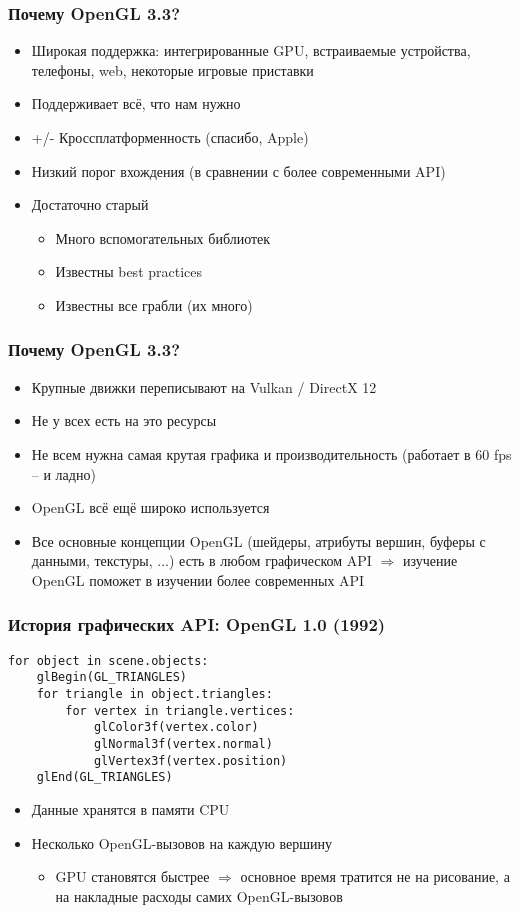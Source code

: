 \documentclass{beamer}
\begin{document}
\begin{frame}
\frametitle{Почему OpenGL 3.3?}
\pause
\begin{itemize}
\item Широкая поддержка: интегрированные GPU, встраиваемые устройства, телефоны, web, некоторые игровые приставки
\pause
\item Поддерживает всё, что нам нужно
\pause
\item +/- Кроссплатформенность \pause (спасибо, Apple)
\pause
\item Низкий порог вхождения (в сравнении с более современными API)
\pause
\item Достаточно старый
\begin{itemize}
\item Много вспомогательных библиотек
\item Известны best practices
\item Известны все грабли \pause (их много)
\end{itemize}
\end{itemize}
\end{frame}

\begin{frame}
\frametitle{Почему OpenGL 3.3?}
\pause
\begin{itemize}
\item Крупные движки переписывают на Vulkan / DirectX 12
\pause
\item Не у всех есть на это ресурсы
\pause
\item Не всем нужна самая крутая графика и производительность (работает в 60 fps -- и ладно)
\pause
\item OpenGL всё ещё широко используется
\pause
\item Все основные концепции OpenGL (шейдеры, атрибуты вершин, буферы с данными, текстуры, ...) есть в любом графическом API $\Rightarrow$ изучение OpenGL поможет в изучении более современных API
\end{itemize}
\end{frame}

\begin{frame}[fragile]
\frametitle{История графических API: OpenGL 1.0 (1992)}
\begin{verbatim}
for object in scene.objects:
    glBegin(GL_TRIANGLES)
    for triangle in object.triangles:
        for vertex in triangle.vertices:
            glColor3f(vertex.color)
            glNormal3f(vertex.normal)
            glVertex3f(vertex.position)
    glEnd(GL_TRIANGLES)
\end{verbatim}
\pause
\begin{itemize}
\item Данные хранятся в памяти CPU
\pause
\item Несколько OpenGL-вызовов на каждую вершину
\pause
\begin{itemize}
\item GPU становятся быстрее $\Longrightarrow$ основное время тратится не на рисование, а на накладные расходы самих OpenGL-вызовов
\end{itemize}
\end{itemize}
\end{frame}
\end{document}
